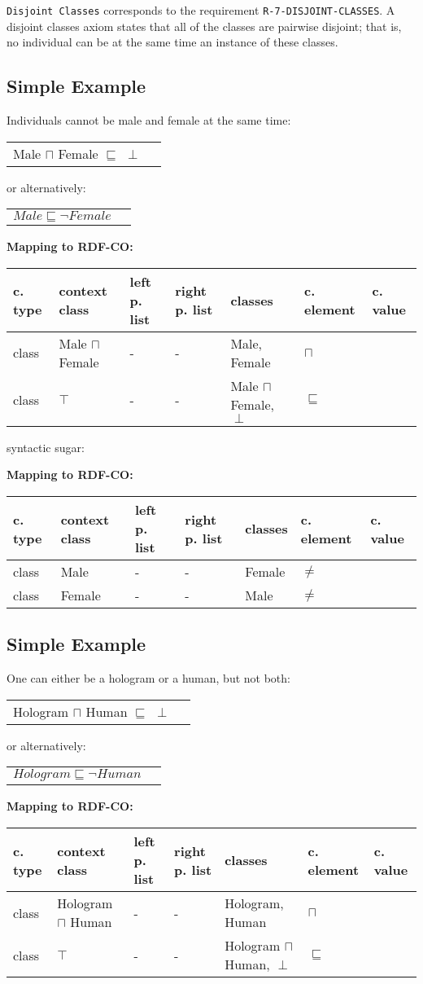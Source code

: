 \documentclass{llncs}
\newcommand{\ms}[1]{\texttt{#1}}
\newenvironment{gcotable}{
  \scriptsize
  \sffamily
  \vspace{0cm}
	\begin{center}
	\textbf{\vspace{0.4cm}Mapping to RDF-CO:} \\
  \begin{tabular}{l|l|l|l|l|l|l}
	\hline
  \textbf{c. type} & \textbf{context class} & \textbf{left p. list} & \textbf{right p. list} & \textbf{classes} & \textbf{c. element} & \textbf{c. value} \\
  \hline

}{
  \hline
  \end{tabular}
	\end{center}
}
\newenvironment{DL}{
  \vspace{0cm}
	\begin{center}
  \begin{tabular}{r l}

}{
  \end{tabular}
	\end{center}
}
\begin{document}
\ms{Disjoint Classes} corresponds to the requirement \ms{R-7-DISJOINT-CLASSES}.
A disjoint classes axiom states that all of the classes are pairwise disjoint; 
that is, no individual can be at the same time an instance of these classes. 

\subsection{Simple Example}

Individuals cannot be male and female at the same time:

\begin{DL}
Male $\sqcap$ Female $\sqsubseteq$ $\perp$\\
\end{DL}

or alternatively:

\begin{DL}
$Male \sqsubseteq \neg Female$
\end{DL}

\begin{gcotable}
class & Male $\sqcap$ Female & - & - & Male, Female & $\sqcap$  \\
class & $\top$ & - & - & Male $\sqcap$ Female, $\perp$ & $\sqsubseteq$ \\
\end{gcotable}

syntactic sugar:

\begin{gcotable}
class & Male & - & - & Female & $\ne$ \\
class & Female & - & - & Male & $\ne$ \\
\end{gcotable}

\subsection{Simple Example}

One can either be a hologram or a human, but not both:

\begin{DL}
Hologram $\sqcap$ Human $\sqsubseteq$ $\perp$\\
\end{DL}

or alternatively:

\begin{DL}
$Hologram \sqsubseteq \neg Human$
\end{DL}

\begin{gcotable}
class & Hologram $\sqcap$ Human & - & - & Hologram, Human & $\sqcap$  \\
class & $\top$ & - & - & Hologram $\sqcap$ Human, $\perp$ & $\sqsubseteq$ \\
\end{gcotable}
\end{document}
